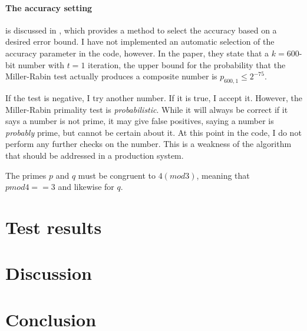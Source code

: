 \documentclass[a4paper,english,12pt]{article}
\begin{document}
\paragraph{The accuracy setting} is discussed in \cite{damgaard1993average}, which
provides a method to select the accuracy based on a desired error bound. I have
not implemented an automatic selection of the accuracy parameter in the code,
however. In the paper, they state that a $k=600$-bit number with $t=1$
iteration, the upper bound for the probability that the Miller-Rabin test
actually produces a composite number is $p_{600, 1} \leqslant 2^{-75}$.

If the test is negative, I try another number. If it is true, I accept
it. However, the Miller-Rabin primality test is \textit{probabilistic}. While
it will always be correct if it says a number is not prime, it may give false
positives, saying a number is \textit{probably} prime, but cannot be certain
about it. At this point in the code, I do not perform any further checks on the
number. This is a weakness of the algorithm that should be addressed in a
production system.

The primes $p$ and $q$ must be congruent to $4 (mod 3)$, meaning that $p mod 4
== 3$ and likewise for $q$.

\section{Test results}

\section{Discussion}

\section{Conclusion}



\end{document}
